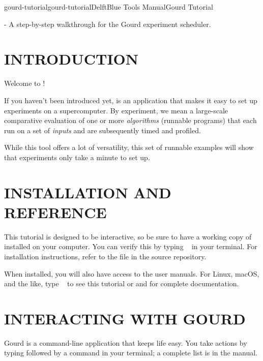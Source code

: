 \documentclass[a4paper,english]{article}
\begin{document}
    \pagestyle{fancy}



    \begin{Name}{1}{gourd-tutorial}{gourd-tutorial}{DelftBlue Tools Manual}{Gourd Tutorial}

         - A step-by-step walkthrough for the Gourd experiment scheduler.

    \end{Name}
    \section{INTRODUCTION}

    Welcome to !

    If you haven't been introduced yet,  is an application that makes it easy
    to set up experiments on a supercomputer.
    By experiment, we mean a large-scale comparative evaluation of one or more
    \emph{algorithms} (runnable programs) that each run on a set of \emph{inputs} and are
    subsequently timed and profiled.

    While this tool offers a lot of versatility, this set of runnable examples will show
    that  experiments only take a minute to set up.

    \section{INSTALLATION AND REFERENCE}

    This tutorial is designed to be interactive, so be sure to have a working copy of
     installed on your computer.
    You can verify this by typing ~ in your terminal.
    For installation instructions, refer to the  file in the source
    repository.

    When installed, you will also have access to the user manuals.
    For Linux, macOS, and the like, type ~ to see this
    tutorial or  and  for complete documentation.

    \section{INTERACTING WITH GOURD}

    Gourd is a command-line application that keeps life easy.
    You take actions by typing  followed by a command in your terminal;
    a complete list is in the manual.
\end{document}
